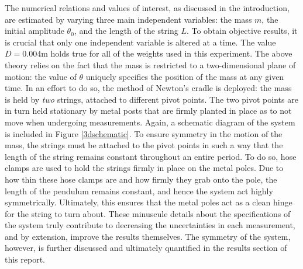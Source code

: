 The numerical relations and values of interest, as discussed in the introduction, are estimated by varying three main independent variables: the mass $m$, the initial amplitude $\theta_0$, and the length of the string $L$. To obtain objective results, it is crucial that only one independent variable is altered at a time. The value $D = 0.004\text{m}$ holds true for all of the weights used in this experiment. The above theory relies on the fact that the mass is restricted to a two-dimensional plane of motion: the value of $\theta$ uniquely specifies the position of the mass at any given time. In an effort to do so, the method of Newton's cradle is deployed: the mass is held by \emph{two} strings, attached to different pivot points. The two pivot points are in turn held stationary by metal posts that are firmly planted in place as to not move when undergoing measurements. Again, a schematic diagram of the system is included in Figure \ref{3dschematic}. To ensure symmetry in the motion of the mass, the strings must be attached to the pivot points in such a way that the length of the string remains constant throughout an entire period. To do so, hose clamps are used to hold the strings firmly in place on the metal poles. Due to how thin these hose clamps are and how firmly they grab onto the pole, the length of the pendulum remains constant, and hence the system act highly symmetrically. Ultimately, this ensures that the metal poles act as a clean hinge for the string to turn about. These minuscule details about the specifications of the system truly contribute to decreasing the uncertainties in each measurement, and by extension, improve the results themselves. The symmetry of the system, however, is further discussed and ultimately quantified in the results section of this report. \\[0.20cm]

